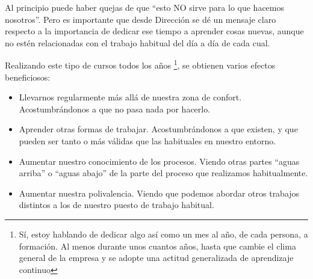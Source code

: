 \documentclass[11pt,a4paper]{article}
\begin{document}
Al principio puede haber quejas de que ``esto NO sirve para lo que hacemos nosotros''. Pero es importante que desde Dirección se dé un mensaje claro respecto a la importancia de dedicar ese tiempo a aprender cosas nuevas, aunque no estén relacionadas con el trabajo habitual del día a día de cada cual.

Realizando este tipo de cursos todos los años \footnote{Sí, estoy hablando de dedicar algo así como un mes al año, de cada persona, a formación. Al menos durante unos cuantos años, hasta que cambie el clima general de la empresa y se adopte una actitud generalizada de aprendizaje continuo}, se obtienen varios efectos beneficiosos:
\begin{itemize}
\item Llevarnos regularmente más allá de nuestra zona de confort. Acostumbrándonos a que no pasa nada por hacerlo.
\item Aprender otras formas de trabajar. Acostumbrándonos a que existen, y que pueden ser tanto o más válidas que las habituales en nuestro entorno.
\item Aumentar nuestro conocimiento de los procesos. Viendo otras partes ``aguas arriba'' o ``aguas abajo'' de la parte del proceso que realizamos habitualmente.
\item Aumentar nuestra polivalencia. Viendo que podemos abordar otros trabajos distintos a los de nuestro puesto de trabajo habitual.
\end{itemize}
\end{document}

